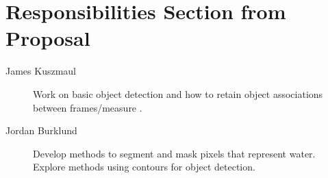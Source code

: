 \documentclass{article}
\begin{document}
\section{Responsibilities Section from Proposal}
\begin{description}
\item[James Kuszmaul] Work on basic object detection and how
  to retain object associations between frames/measure .

\item[Jordan Burklund] Develop methods to segment and mask pixels that represent water. Explore methods using contours for object detection.
\end{description}



\end{document}
